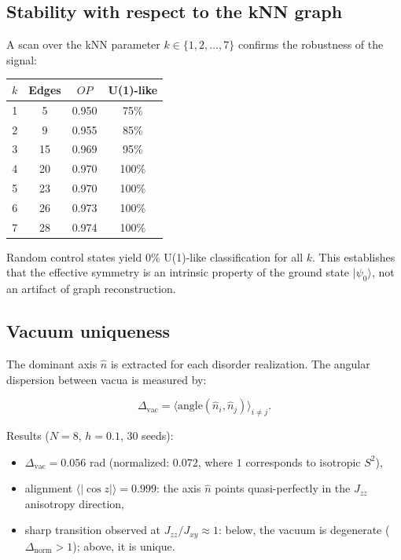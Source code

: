 \documentclass[11pt]{article}
\begin{document}
\subsection{Stability with respect to the kNN graph}

A scan over the kNN parameter $k \in \{1,2,\ldots,7\}$
confirms the robustness of the signal:

\begin{center}
\begin{tabular}{cccc}
\toprule
$k$ & Edges & $OP$ & U(1)-like \\
\midrule
1 & 5  & 0.950 & 75\% \\
2 & 9  & 0.955 & 85\% \\
3 & 15 & 0.969 & 95\% \\
4 & 20 & 0.970 & 100\% \\
5 & 23 & 0.970 & 100\% \\
6 & 26 & 0.973 & 100\% \\
7 & 28 & 0.974 & 100\% \\
\bottomrule
\end{tabular}
\end{center}

Random control states yield $0\%$ U(1)-like classification for all $k$.
This establishes that the effective symmetry is an intrinsic property
of the ground state $|\psi_0\rangle$, not an artifact of graph
reconstruction.

\subsection{Vacuum uniqueness}

The dominant axis $\hat{n}$ is extracted for each disorder realization.
The angular dispersion between vacua is measured by:

\[
\Delta_{\mathrm{vac}} = \langle \mathrm{angle}(\hat{n}_i, \hat{n}_j) \rangle_{i \neq j}.
\]

Results ($N=8$, $h=0.1$, 30 seeds):

\begin{itemize}
\item $\Delta_{\mathrm{vac}} = 0.056$ rad (normalized: $0.072$, where
      $1$ corresponds to isotropic $S^2$),
\item alignment $\langle |\cos z| \rangle = 0.999$: the axis $\hat{n}$
      points quasi-perfectly in the $J_{zz}$ anisotropy direction,
\item sharp transition observed at $J_{zz}/J_{xy} \approx 1$:
      below, the vacuum is degenerate ($\Delta_{\mathrm{norm}} > 1$);
      above, it is unique.
\end{itemize}
\end{document}
